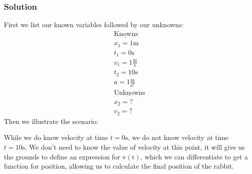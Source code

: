 \documentclass{article}
\begin{document}
	\subsubsection{Solution}
	First we list our known variables followed by our unknowns:
	\begin{align*}
	&\mathrm{\underline{Knowns}}\\
	&x_1 =1\mathrm{m} \\
	&t_1 =0\mathrm{s}\\
	&v_1 =1\mathrm{\frac{m}{s}} \\
	&t_2 = 10\mathrm{s}\\
	&a =1\mathrm{\frac{m}{s^2}}\\
	&\mathrm{\underline{Unknowns}}\\
	&x_2 = ?\\
	&v_2 = ?
	\end{align*}
	Then we illustrate the scenario:
	\begin{figure}[hh]
	\begin{center}
	\end{center}
    \end{figure}
	While we do know velocity at time $t=0\mathrm{s}$, we do not know velocity at time $t=10\mathrm{s}$.
	We don't need to know the value of velocity at this point, it will give us the grounds to define an expression
	for $\mathrm{v(t)}$, which we can differentiate to get a function for position, allowing us to calculate the final
	position of the rabbit.
\end{document}
